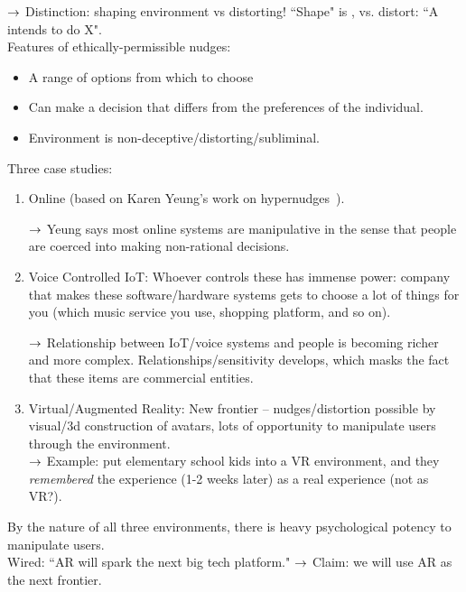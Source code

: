 $\rightarrow$ Distinction: shaping environment vs distorting! ``Shape" is , vs. distort: ``A intends to do X". \\


Features of ethically-permissible nudges:
\begin{itemize}
    \item A range of options from which to choose
    \item Can make a decision that differs from the preferences of the individual.
    \item Environment is non-deceptive/distorting/subliminal.
\end{itemize}

Three case studies:
\begin{enumerate}
    \item Online (based on Karen Yeung's work on hypernudges~\cite{yeung2017hypernudge}).
    
    $\rightarrow$ Yeung says most online systems are manipulative in the sense that people are coerced into making non-rational decisions.
    
    \item Voice Controlled IoT: Whoever controls these has immense power: company that makes these software/hardware systems gets to choose a lot of things for you (which music service you use, shopping platform, and so on).
    
    $\rightarrow$ Relationship between IoT/voice systems and people is becoming richer and more complex. Relationships/sensitivity develops, which masks the fact that these items are commercial entities.
    
    \item Virtual/Augmented Reality: New frontier -- nudges/distortion possible by visual/3d construction of avatars, lots of opportunity to manipulate users through the environment. \\
    
    $\rightarrow$ Example: put elementary school kids into a VR environment, and they {\it remembered} the experience (1-2 weeks later) as a real experience (not as VR?).
    
\end{enumerate}

By the nature of all three environments, there is heavy psychological potency to manipulate users. \\

Wired: ``AR will spark the next big tech platform." $\rightarrow$ Claim: we will use AR as the next frontier.

